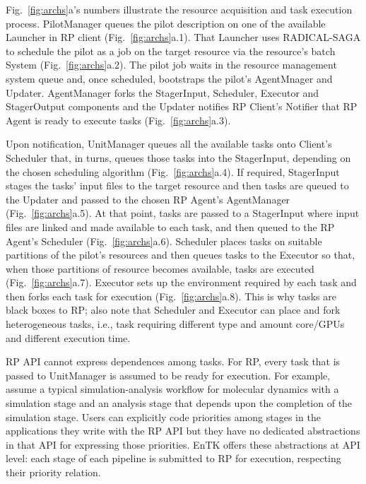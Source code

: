 \documentclass[preprint,12pt, a4paper]{elsarticle}
\begin{document}
Fig.~\ref{fig:archs}a's numbers illustrate the resource acquisition and task
execution process. PilotManager queues the pilot description on one of the
available Launcher in RP client (Fig.~\ref{fig:archs}a.1). That Launcher uses
RADICAL-SAGA to schedule the pilot as a job on the target resource via the
resource's batch System (Fig.~\ref{fig:archs}a.2). The pilot job waits in the
resource management system queue and, once scheduled, bootstraps the pilot's
AgentMnager and Updater. AgentManager forks the StagerInput, Scheduler,
Executor and StagerOutput components and the Updater notifies RP Client's
Notifier that RP Agent is ready to execute tasks (Fig.~\ref{fig:archs}a.3).

Upon notification, UnitManager queues all the available tasks onto Client's
Scheduler that, in turns, queues those tasks into the StagerInput, depending
on the chosen scheduling algorithm (Fig.~\ref{fig:archs}a.4). If required,
StagerInput stages the tasks' input files to the target resource and then
tasks are queued to the Updater and passed to the chosen RP Agent's
AgentManager (Fig.~\ref{fig:archs}a.5). At that point, tasks are passed to a
StagerInput where input files are linked and made available to each task, and
then queued to the RP Agent's Scheduler (Fig.~\ref{fig:archs}a.6). Scheduler
places tasks on suitable partitions of the pilot's resources and then queues
tasks to the Executor so that, when those partitions of resource becomes
available, tasks are executed (Fig.~\ref{fig:archs}a.7). Executor sets up the
environment required by each task and then forks each task for execution
(Fig.~\ref{fig:archs}a.8). This is why tasks are black boxes to RP\@; also
note that Scheduler and Executor can place and fork heterogeneous tasks,
i.e., task requiring different type and amount core/GPUs and different
execution time.

RP API cannot express dependences among tasks. For RP, every task that is
passed to UnitManager is assumed to be ready for execution. For example,
assume a typical simulation-analysis workflow for molecular dynamics with a
simulation stage and an analysis stage that depends upon the completion of
the simulation stage. Users can explicitly code priorities among stages in
the applications they write with the RP API but they have no dedicated
abstractions in that API for expressing those priorities. EnTK offers these
abstractions at API level: each stage of each pipeline is submitted to RP for
execution, respecting their priority relation.
\end{document}
